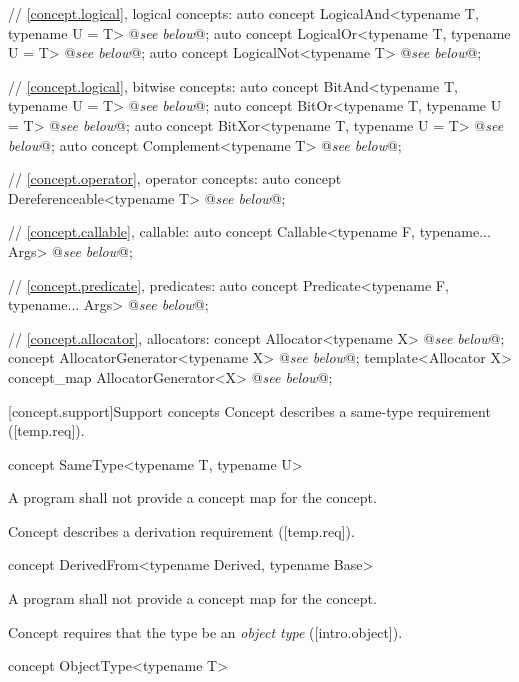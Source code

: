 \documentclass[american,twoside]{book}
\begin{document}
\begin{codeblock}
{  // \ref{concept.logical}, logical concepts:
  auto concept LogicalAnd<typename T, typename U = T> @\textit{see below}@;
  auto concept LogicalOr<typename T, typename U = T> @\textit{see below}@;
  auto concept LogicalNot<typename T> @\textit{see below}@;

  // \ref{concept.logical}, bitwise concepts:
  auto concept BitAnd<typename T, typename U = T> @\textit{see below}@;
  auto concept BitOr<typename T, typename U = T> @\textit{see below}@;
  auto concept BitXor<typename T, typename U = T> @\textit{see below}@;
  auto concept Complement<typename T> @\textit{see below}@;

  // \ref{concept.operator}, operator concepts:
  auto concept Dereferenceable<typename T> @\textit{see below}@;

  // \ref{concept.callable}, callable:
  auto concept Callable<typename F, typename... Args> @\textit{see below}@;

  // \ref{concept.predicate}, predicates:
  auto concept Predicate<typename F, typename... Args> @\textit{see below}@;

  // \ref{concept.allocator}, allocators:
  concept Allocator<typename X> @\textit{see below}@;
  concept AllocatorGenerator<typename X> @\textit{see below}@;
  template<Allocator X> concept_map AllocatorGenerator<X> @\textit{see below}@;
}
\end{codeblock}

[concept.support]{Support concepts}
\pnum
Concept  describes a same-type requirement ([temp.req]).

\begin{itemdecl}
concept SameType<typename T, typename U> {  }
\end{itemdecl}

\pnum
A program shall not provide a concept map for the
 concept.

\pnum
Concept  describes a derivation requirement ([temp.req]).

\begin{itemdecl}
concept DerivedFrom<typename Derived, typename Base> { }
\end{itemdecl}

\pnum
A program shall not provide a concept map for the
 concept.

\pnum
Concept  requires that the type  be an \emph{object type} ([intro.object]).

\begin{itemdecl}
concept ObjectType<typename T> { }
\end{itemdecl}
\end{document}
